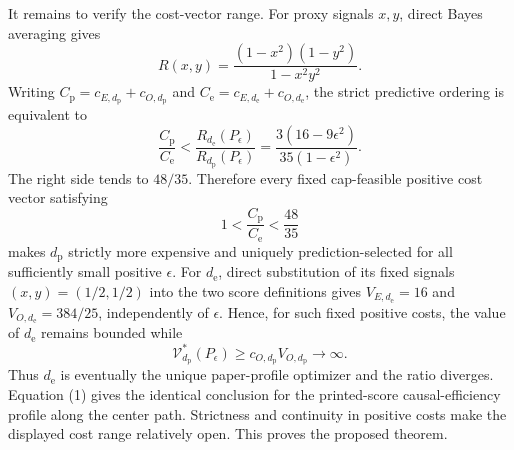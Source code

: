 It remains to verify the cost-vector range. For proxy signals \(x,y\), direct Bayes averaging gives
\[
 R(x,y)=\frac{(1-x^2)(1-y^2)}{1-x^2y^2}.
\]
Writing \(C_{\mathrm p}=c_{E,d_{\mathrm p}}+c_{O,d_{\mathrm p}}\) and \(C_{\mathrm e}=c_{E,d_{\mathrm e}}+c_{O,d_{\mathrm e}}\), the strict predictive ordering is equivalent to
\[
 \frac{C_{\mathrm p}}{C_{\mathrm e}}
 <\frac{R_{d_{\mathrm e}}(P_\epsilon)}{R_{d_{\mathrm p}}(P_\epsilon)}
 =\frac{3(16-9\epsilon^2)}{35(1-\epsilon^2)}. \tag{3}
\]
The right side tends to \(48/35\). Therefore every fixed cap-feasible positive cost vector satisfying
\[
 1<\frac{C_{\mathrm p}}{C_{\mathrm e}}<\frac{48}{35}
\]
makes \(d_{\mathrm p}\) strictly more expensive and uniquely prediction-selected for all sufficiently small positive \(\epsilon\). For \(d_{\mathrm e}\), direct substitution of its fixed signals \((x,y)=(1/2,1/2)\) into the two score definitions gives \(V_{E,d_{\mathrm e}}=16\) and \(V_{O,d_{\mathrm e}}=384/25\), independently of \(\epsilon\). Hence, for such fixed positive costs, the value of \(d_{\mathrm e}\) remains bounded while
\[
 \mathcal V_{d_{\mathrm p}}^*(P_\epsilon)
 \ge c_{O,d_{\mathrm p}}V_{O,d_{\mathrm p}}\longrightarrow\infty.
\]
Thus \(d_{\mathrm e}\) is eventually the unique paper-profile optimizer and the ratio diverges. Equation (1) gives the identical conclusion for the printed-score causal-efficiency profile along the center path. Strictness and continuity in positive costs make the displayed cost range relatively open. This proves the proposed theorem.